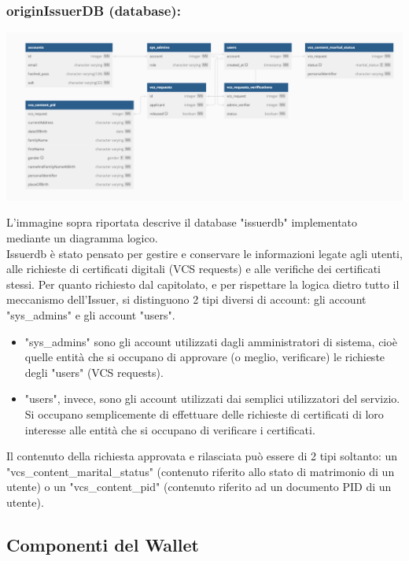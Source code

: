 \subsubsection{originIssuerDB (database):}
    \begin{center}
        \includegraphics[scale = 0.3]{./res/img/issuerdb.png}
      \end{center}
    L'immagine sopra riportata descrive il database "issuerdb" implementato mediante un diagramma logico.\\
    Issuerdb è stato pensato per gestire e conservare le informazioni legate agli utenti, alle richieste di certificati digitali (VCS requests) e alle verifiche dei certificati stessi.
    Per quanto richiesto dal capitolato, e per rispettare la logica dietro tutto il meccanismo dell'Issuer, si distinguono 2 tipi diversi di account: gli account "sys\_admins" e gli account "users".\\
    \begin{itemize}
    \item "sys\_admins" sono gli account utilizzati dagli amministratori di sistema, cioè quelle entità che si occupano di approvare (o meglio, verificare) le richieste degli "users" (VCS requests).\\
    \item "users", invece, sono gli account utilizzati dai semplici utilizzatori del servizio. Si occupano semplicemente di effettuare delle richieste di certificati di loro interesse alle entità che si occupano di verificare i certificati.\\
    \end{itemize}
    Il contenuto della richiesta approvata e rilasciata può essere di 2 tipi soltanto: un "vcs\_content\_marital\_status" (contenuto riferito allo stato di matrimonio di un utente) o un "vcs\_content\_pid" (contenuto riferito ad un documento PID di un utente).\\

\subsection{Componenti del \textbf{Wallet}}

